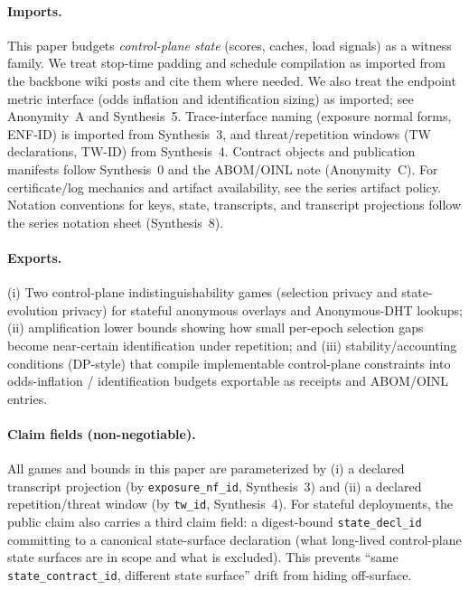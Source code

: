 \documentclass[11pt]{article}
\begin{document}
\paragraph{Imports.}
This paper budgets \emph{control-plane state} (scores, caches, load signals) as a witness family.
We treat stop-time padding and schedule compilation as imported from the backbone wiki posts and cite them where needed.
We also treat the endpoint metric interface (odds inflation and identification sizing) as imported; see Anonymity~A and Synthesis~5.\cite{series:oddsinflation,series:endpointbridge}
Trace-interface naming (exposure normal forms, ENF-ID) is imported from Synthesis~3, and threat/repetition windows (TW declarations, TW-ID) from Synthesis~4.\cite{series:traceifaces,series:threatwindows}
Contract objects and publication manifests follow Synthesis~0 and the ABOM/OINL note (Anonymity~C).\cite{series:contractobjects,series:abomoinl}
For certificate/log mechanics and artifact availability, see the series artifact policy.\cite{series:artifactpolicy}
Notation conventions for keys, state, transcripts, and transcript projections follow the series notation sheet (Synthesis~8).\cite{series:notation}


\paragraph{Exports.}
(i) Two control-plane indistinguishability games (selection privacy and state-evolution privacy) for stateful anonymous overlays and Anonymous-DHT lookups;
(ii) amplification lower bounds showing how small per-epoch selection gaps become near-certain identification under repetition; and
(iii) stability/accounting conditions (DP-style) that compile implementable control-plane constraints into odds-inflation / identification budgets exportable as receipts and ABOM/OINL entries.\cite{series:contractobjects,series:abomoinl}

\paragraph{Claim fields (non-negotiable).}
All games and bounds in this paper are parameterized by
(i) a declared transcript projection (by \texttt{exposure\_nf\_id}, Synthesis~3) and
(ii) a declared repetition/threat window (by \texttt{tw\_id}, Synthesis~4).\cite{series:traceifaces,series:threatwindows}
For stateful deployments, the public claim also carries a third claim field:
a digest-bound \texttt{state\_decl\_id} committing to a canonical state-surface declaration (what long-lived control-plane state surfaces are in scope and what is excluded).\cite{series:planstateequiv,series:workedexample}
This prevents ``same \texttt{state\_contract\_id}, different state surface'' drift from hiding off-surface.
\end{document}
